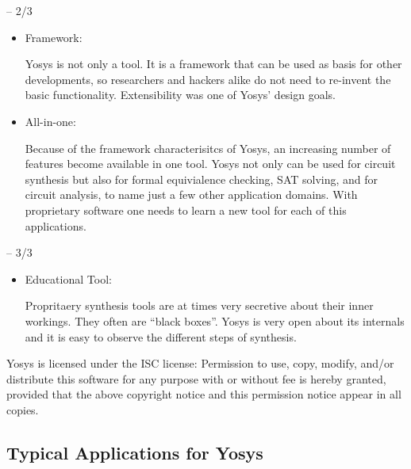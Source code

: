 \begin{frame}{\subsecname{} -- 2/3}
\begin{itemize}
\item Framework: \smallskip\par
Yosys is not only a tool. It is a framework that can be used as basis for other
developments, so researchers and hackers alike do not need to re-invent the
basic functionality. Extensibility was one of Yosys' design goals.

\bigskip
\item All-in-one: \smallskip\par
Because of the framework characterisitcs of Yosys, an increasing number of features
become available in one tool. Yosys not only can be used for circuit synthesis but
also for formal equivialence checking, SAT solving, and for circuit analysis, to
name just a few other application domains. With proprietary software one needs to
learn a new tool for each of this applications.
\end{itemize}
\end{frame}

\begin{frame}{\subsecname{} -- 3/3}
\begin{itemize}
\item Educational Tool: \smallskip\par
Propritaery synthesis tools are at times very secretive about their inner
workings. They often are ``black boxes''. Yosys is very open about its
internals and it is easy to observe the different steps of synthesis.
\end{itemize}

\bigskip
\begin{block}{Yosys is licensed under the ISC license:}
Permission to use, copy, modify, and/or distribute this software for any
purpose with or without fee is hereby granted, provided that the above
copyright notice and this permission notice appear in all copies.
\end{block}
\end{frame}


\subsection{Typical Applications for Yosys}

